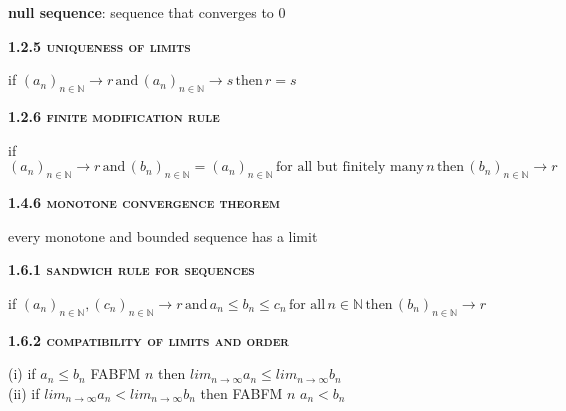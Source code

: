 \documentclass[a4paper]{article}
\begin{document}
\begin{multicols}{2}
\begin{framed}
	\noindent
	\textbf{null sequence}: sequence that converges to 0
\end{framed}

\begin{framed}
	\begin{center}
		\textbf{\textsc{1.2.5 uniqueness of limits}}
	\end{center}
	if $(a_n)_{n\in \mathbb{N}} \rightarrow r \, \text{and} \, (a_n)_{n\in \mathbb{N}} \rightarrow s \, \text{then} \, r = s$
\end{framed}

\begin{framed}
	\begin{center}
		\textbf{\textsc{1.2.6 finite modification rule}}
	\end{center}
	if $(a_n)_{n\in \mathbb{N}} \rightarrow r \, \text{and} \, (b_n)_{n\in \mathbb{N}} = (a_n)_{n\in \mathbb{N}} \, \text{for all but finitely many} \, n \, \text{then} \, (b_n)_{n\in \mathbb{N}} \rightarrow r$
\end{framed}

\begin{framed}
	\begin{center}
		\textbf{\textsc{1.4.6 monotone convergence theorem}}
	\end{center}
	every monotone and bounded sequence has a limit
\end{framed}

\begin{framed}
	\begin{center}
		\textbf{\textsc{1.6.1 sandwich rule for sequences}}
	\end{center}
	if $(a_n)_{n\in \mathbb{N}}, (c_n)_{n\in \mathbb{N}} \rightarrow r \, \text{and} \, a_n \leq b_n \leq c_n \, \text{for all} \, n \in \mathbb{N} \, \text{then} \, (b_n)_{n\in \mathbb{N}} \rightarrow r$
\end{framed}

\begin{framed}
	\begin{center}
		\textbf{\textsc{1.6.2 compatibility of limits and order}}
	\end{center}
	(i) if $a_n \leq b_n$ FABFM $n$ then $lim_{n \rightarrow \infty}a_n \leq lim_{n \rightarrow \infty}b_n$\\
	(ii) if $lim_{n \rightarrow \infty}a_n < lim_{n \rightarrow \infty}b_n$ then FABFM $n$ $a_n < b_n$
\end{framed}


\end{multicols}
\end{document}
